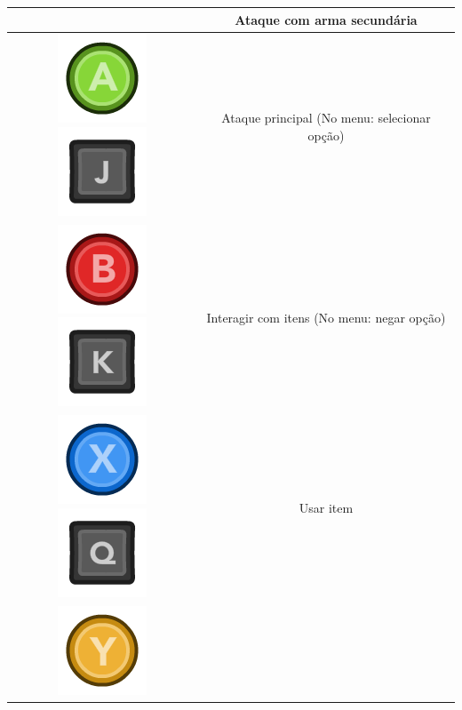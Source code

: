 \documentclass[12pt]{article}
\begin{document}
\begin{longtable}{|c|c|}
& Ataque com arma secundária
\\
\hline
\includegraphics[scale=0.3]{images/360_A.png}
\includegraphics[scale=0.3]{images/kJ.png}
& Ataque principal (No menu: selecionar opção)
\\
\hline
\includegraphics[scale=0.3]{images/360_B.png}
\includegraphics[scale=0.3]{images/kK.png}
& Interagir com itens (No menu: negar opção)
\\
\hline
\includegraphics[scale=0.3]{images/360_X.png}
\includegraphics[scale=0.3]{images/kQ.png}
& Usar item 
\\
\hline
\includegraphics[scale=0.3]{images/360_Y.png}

\end{longtable}
\end{document}
